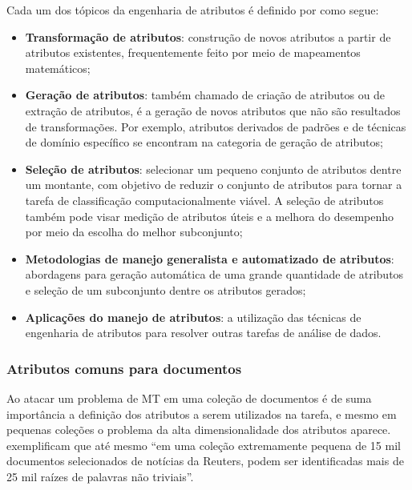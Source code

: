         Cada um dos tópicos da engenharia de atributos é definido por  como segue:
        \begin{itemize}
            \item \textbf{Transformação de atributos}: construção de novos atributos a partir de atributos existentes, frequentemente feito por meio de mapeamentos matemáticos;
            
            \item \textbf{Geração de atributos}: também chamado de criação de atributos ou de extração de atributos, é  a geração de novos atributos que não são resultados de transformações. 
            Por exemplo, atributos derivados de padrões e de técnicas de domínio específico se encontram na categoria de geração de atributos;
            
            \item \textbf{Seleção de atributos}: selecionar um pequeno conjunto de atributos dentre um montante, com objetivo de reduzir o conjunto de atributos para tornar a tarefa de classificação computacionalmente viável. 
            A seleção de atributos também pode visar medição de atributos úteis e a melhora do desempenho por meio da escolha do melhor subconjunto;
            
            \item \textbf{Metodologias de manejo generalista e automatizado de atributos}: abordagens para geração automática de uma grande quantidade de atributos e seleção de um subconjunto dentre os atributos gerados;
            
            \item \textbf{Aplicações do manejo de atributos}: a utilização das técnicas de engenharia de atributos para resolver outras tarefas de análise de dados.
        \end{itemize}

        \subsubsection{Atributos comuns para documentos} \label{subsubsec:Atributos-comuns-documentos}
            Ao atacar um problema de MT em uma coleção de documentos é de suma importância a definição dos atributos a serem utilizados na tarefa, e mesmo em pequenas coleções o problema da alta dimensionalidade dos atributos aparece.
             exemplificam que até mesmo ``em uma coleção extremamente pequena de 15 mil documentos selecionados de notícias da Reuters, podem ser identificadas mais de 25 mil raízes de palavras não triviais''.
            
